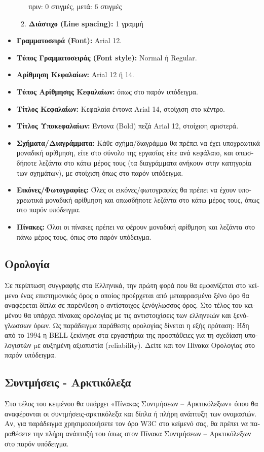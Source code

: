 \documentclass[inscr,ack,preface]{dithesis}
\begin{document}
\begin{greek}
\begin{itemize}
\begin{enumerate}[$\circ$]
        πριν: 0 στιγμές, μετά: 6 στιγμές
        \item \textbf{Διάστιχο (Line spacing):} 1 γραμμή
      \end{enumerate}
      \item \textbf{Γραμματοσειρά (Font):} Arial 12.
      \item \textbf{Τύπος Γραμματοσειράς (Font style):} Normal ή Regular.
      \item \textbf{Αρίθμηση Κεφαλαίων:} Arial 12 ή 14.
      \item \textbf{Τύπος Αρίθμησης Κεφαλαίων:} όπως στο παρόν υπόδειγμα.
      \item \textbf{Τίτλος Κεφαλαίων:} Κεφαλαία έντονα Arial 14, στοίχιση στο κέντρο.
      \item \textbf{Τίτλος Υποκεφαλαίων:} Έντονα (Bold) πεζά Arial 12, στοίχιση αριστερά.
      \item \textbf{Σχήματα/Διαγράμματα:} Κάθε σχήμα/διαγράμμα θα πρέπει να έχει υποχρεωτικά μοναδική αρίθμηση, είτε στο σύνολο της εργασίας είτε ανά κεφάλαιο, και οπωσδήποτε λεζάντα στο κάτω μέρος τους (τα διαγράμματα ανήκουν στην κατηγορία των σχημάτων), με στοίχιση όπως στο παρόν υπόδειγμα.
      \item \textbf{Εικόνες/Φωτογραφίες:} Όλες οι εικόνες/φωτογραφίες θα πρέπει να έχουν υποχρεωτικά μοναδική αρίθμηση και οπωσδήποτε λεζάντα στο κάτω μέρος τους, όπως στο παρόν υπόδειγμα.
      \item \textbf{Πίνακες:} Όλοι οι πίνακες πρέπει να φέρουν μοναδική αρίθμηση και λεζάντα στο πάνω μέρος τους, όπως στο παρόν υπόδειγμα.
    \end{itemize}

    \subsection{Ορολογία}
    Σε περίπτωση συγγραφής στα Ελληνικά, την πρώτη φορά που θα εμφανίζεται στο κείμενο ένας επιστημονικός όρος ο οποίος προέρχεται από μεταφρασμένο ξένο όρο θα αναφέρεται δίπλα σε παρένθεση ο αντίστοιχος ξενόγλωσσος όρος. Στο τέλος του κειμένου θα υπάρχει πίνακας ορολογίας με τις αντιστοιχίσεις των ελληνικών και ξενόγλωσσων όρων. Ως παράδειγμα παράθεσης ορολογίας δίνεται η εξής πρόταση: Ήδη από το 1994 η BELL ξεκίνησε στα εργαστήρια της προσπάθειες για τη σχεδίαση υπολογιστών µε αυξημένη αξιοπιστία (reliability). Δείτε και τον Πίνακα Ορολογίας στο παρόν υπόδειγμα.

    \subsection{Συντμήσεις - Αρκτικόλεξα}
    Στο τέλος του κειμένου θα υπάρχει «Πίνακας Συντμήσεων – Αρκτικόλεξων» όπου θα αναφέρονται οι συντμήσεις-αρκτικόλεξα και δίπλα ή πλήρη ανάπτυξη των ονομασιών. Αν, για παράδειγμα χρησιμοποιήσετε τον όρο W3C στο κείμενό σας, θα πρέπει να παραθέσετε την πλήρη ανάπτυξή του όπως στον Πίνακα Συντμήσεων – Αρκτικόλεξων στο παρόν υπόδειγμα.


\end{greek}
\end{document}
